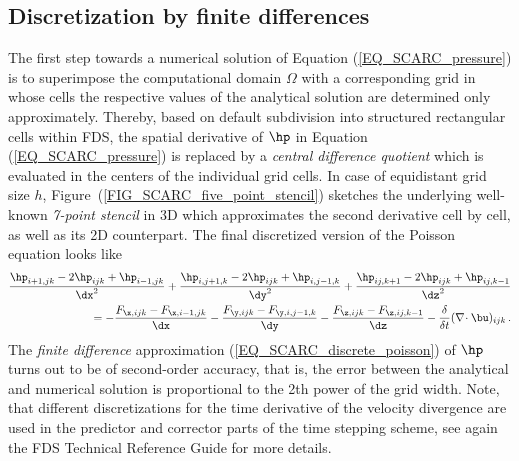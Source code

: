 \subsection{Discretization by finite differences}
\label{SEC_SCARC_discretization_poisson}

The first step towards a numerical solution of Equation (\ref{EQ_SCARC_pressure}) is to superimpose the computational domain $\Omega$ with a corresponding grid in whose cells the respective values of the analytical solution are determined only approximately. 
Thereby, based on default subdivision into structured rectangular cells within FDS,
the spatial derivative of $\hp$ in Equation (\ref{EQ_SCARC_pressure}) is replaced by a 
{\it central difference quotient} which is evaluated in the centers of the individual grid cells.  In case of equidistant grid size $h$, %
Figure~(\ref{FIG_SCARC_five_point_stencil}) sketches the underlying well-known {\it 7-point stencil} in 3D which approximates the second derivative cell by cell, as well as its 2D counterpart.
%
The final discretized version of the Poisson equation looks like
\small
\begin{align}
\frac{\hp_{i+1,jk}-2\hp_{ijk}+\hp_{i-1,jk}}{\dx^2} +
\frac{\hp_{i,j+1,k}-2\hp_{ijk}+\hp_{i,j-1,k}}{\dy^2} +
\frac{\hp_{ij,k+1}-2\hp_{ijk}+\hp_{ij,k-1}}{\dz^2} \notag \\ =
    -\frac{F_{\x,ijk} - F_{\x,i-1,jk}}{\dx}
    -\frac{F_{\y,ijk} - F_{\y,i,j-1,k}}{\dy}
    -\frac{F_{\z,ijk} - F_{\z,ij,k-1}}{\dz} - \frac{\delta}{\delta t}(\nabla\!\cdot \bu)_{ijk}\,.
\label{EQ_SCARC_discrete_poisson}
\end{align}
\normalsize
The {\it finite difference} approximation (\ref{EQ_SCARC_discrete_poisson})
of $\hp$ turns out to be of second-order accuracy, that is, the error between the analytical and numerical solution is proportional to the 2th power of the grid width.
Note, that different discretizations for the time derivative of the velocity divergence are used in the predictor and corrector parts of the time stepping scheme, see again the FDS Technical Reference Guide\cite{McGrattan:2018:TG} for more details. 

